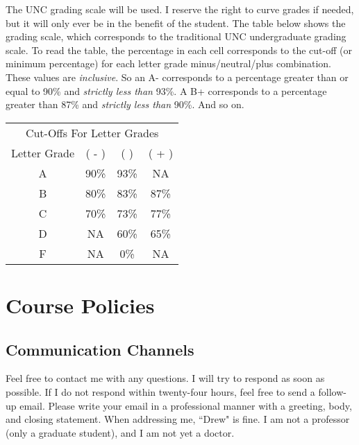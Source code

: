\documentclass[11pt]{article}
\begin{document}
The UNC grading scale will be used. I reserve the right to curve grades if needed, but it will only ever be in the benefit of the student. The table below shows the grading scale, which corresponds to the traditional UNC undergraduate grading scale. To read the table, the percentage in each cell corresponds to the cut-off (or minimum percentage) for each letter grade minus/neutral/plus combination. These values are \textit{inclusive}. So an A- corresponds to a percentage greater than or equal to 90\% and \textit{strictly less than} 93\%. A B+ corresponds to a percentage greater than 87\% and \textit{strictly less than} 90\%. And so on. 

\begin{table}[H]
\centering
\begin{tabular}{@{}cccc@{}} \toprule
\multicolumn{4}{c}{Cut-Offs For Letter Grades} \\ \cmidrule(r){1-4}
Letter Grade & ( - ) & (  ) & ( + ) \\ \midrule
A & 90\% & 93\% & NA \\ 
B & 80\% & 83\% & 87\% \\
C & 70\% & 73\% & 77\% \\
D & NA & 60\% & 65\% \\
F & NA & 0\% & NA \\ \bottomrule
\end{tabular}
\end{table}



  
\newpage


\section*{Course Policies}\label{sec:Policies}

\subsection*{Communication Channels}
Feel free to contact me with any questions. I will try to respond as soon as possible. If I do not respond within twenty-four hours, feel free to send a follow-up email. Please write your email in a professional manner with a greeting, body, and closing statement. When addressing me, ``Drew" is fine. I am not a professor (only a graduate student), and I am not yet a doctor. 
\end{document}
